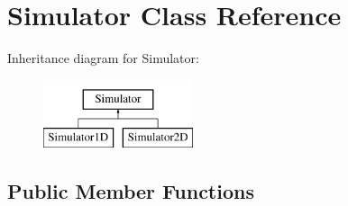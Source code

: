 \hypertarget{class_simulator}{}\section{Simulator Class Reference}
\label{class_simulator}
Inheritance diagram for Simulator\+:\begin{figure}[H]
\begin{center}
\leavevmode
\includegraphics[height=2.000000cm]{class_simulator}
\end{center}
\end{figure}
\subsection*{Public Member Functions}
